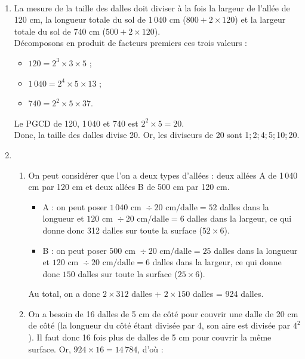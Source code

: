 \ \\ [-5mm]
  \begin{enumerate}
      \item La mesure de la taille des dalles doit diviser à la fois la largeur de l'allée de 120 cm, la longueur totale du sol de 1\,040 cm ($800+2\times120$) et la largeur totale du sol de 740 cm ($500+2\times120$). \\
      Décomposons en produit de facteurs premiers ces trois valeurs :
      \begin{itemize}
         \item $120 =2^3\times3\times5$ ;
         \item $1\,040 =2^4\times5\times13$ ;
         \item $740 =2^2\times5\times37$.
      \end{itemize}
      Le PGCD de 120, 1\,040 et 740 est $2^2\times5 =20$. \\
      Donc, la taille des dalles divise 20. Or, les diviseurs de 20 sont 1;\,2;\,4;\,5;\,10;\,20. \\
      \item
      \begin{enumerate}
         \item On peut considérer que l'on a deux types d'allées : deux allées A de 1\,040 cm par 120 cm et deux allées B de 500 cm par 120 cm.
         \begin{itemize}
            \item A : on peut poser $1\,040\text{ cm }\div20 \text{ cm/dalle}=52$ dalles dans la longueur et $120\text{ cm }\div20\text{ cm/dalle} =6$ dalles dans la largeur, ce qui donne donc 312 dalles sur toute la surface ($52\times6$).
            \item B : on peut poser $500\text{ cm }\div20 \text{ cm/dalle}=25$ dalles dans la longueur et $120\text{ cm }\div20\text{ cm/dalle} =6$ dalles dans la largeur, ce qui donne donc $150$ dalles sur toute la surface ($25\times6$).
         \end{itemize}
         Au total, on a donc $2\times312$ dalles + $2\times150$ dalles = 924 dalles. \\
         \item On a besoin de 16 dalles de 5 cm de côté pour couvrir une dalle de 20 cm de côté (la longueur du côté étant divisée par 4, son aire est divisée par $4^2$). Il faut donc 16 fois plus de dalles de 5 cm pour couvrir la même surface. Or, $924\times16 =14\,784$, d'où : \\
      \end{enumerate}
   \end{enumerate}
